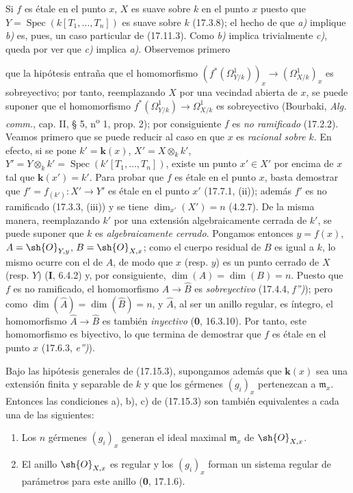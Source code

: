 Si $f$ es étale en el punto $x$, $X$ es suave sobre $k$ en el punto $x$ puesto que $Y=\operatorname{Spec}(k[T_1,\ldots,T_n])$ es suave sobre $k$ (17.3.8); el hecho de que \emph{a)} implique \emph{b)} es, pues, un caso particular de (17.11.3). Como \emph{b)} implica trivialmente \emph{c)}, queda por ver que \emph{c)} implica \emph{a)}. Observemos primero


que la hipótesis entraña que el homomorfismo $(f^*(\varOmega^1_{Y/k}))_x\to(\varOmega^1_{X/k})_x$ es sobreyectivo; por tanto, reemplazando $X$ por una vecindad abierta de $x$, se puede suponer que el homomorfismo $f^*(\varOmega^1_{Y/k})\to\varOmega^1_{X/k}$ es sobreyectivo (Bourbaki, \emph{Alg. comm.}, cap. II, § 5, n\textsuperscript{o} 1, prop. 2); por consiguiente $f$ es \emph{no ramificado} (17.2.2). Veamos primero que se puede reducir al caso en que $x$ es \emph{racional sobre $k$}. En efecto, si se pone $k'=\boldsymbol{k}(x)$, $X'=X\otimes_k k'$, $Y'=Y\otimes_k k'=\operatorname{Spec}(k'[T_1,\ldots,T_n])$, existe un punto $x'\in X'$ por encima de $x$ tal que $\boldsymbol{k}(x')=k'$. Para probar que $f$ es étale en el punto $x$, basta demostrar que $f'=f_{(k')}:X'\to Y'$ es étale en el punto $x'$ (17.7.1, (ii)); además $f'$ es no ramificado (17.3.3, (iii)) y se tiene $\dim_{x'}(X')=n$ (4.2.7). De la misma manera, reemplazando $k'$ por una extensión algebraicamente cerrada de $k'$, se puede suponer que $k$ es \emph{algebraicamente cerrado}. Pongamos entonces $y=f(x)$, $A=\sh{O}_{Y,y}$, $B=\sh{O}_{X,x}$; como el cuerpo residual de $B$ es igual a $k$, lo mismo ocurre con el de $A$, de modo que $x$ (resp. $y$) es un punto cerrado de $X$ (resp. $Y$) (\textbf I, 6.4.2) y, por consiguiente, $\dim(A)=\dim(B)=n$. Puesto que $f$ es no ramificado, el homomorfismo $\widehat A\to\widehat B$ es \emph{sobreyectivo} (17.4.4, \emph{f'')}); pero como $\dim(\widehat A)=\dim(\widehat B)=n$, y $\widehat A$, al ser un anillo regular, es íntegro, el homomorfismo $\widehat A\to\widehat B$ es también \emph{inyectivo} (\textbf 0, 16.3.10). Por tanto, este homomorfismo es biyectivo, lo que termina de demostrar que $f$ es étale en el punto $x$ (17.6.3, \emph{e'')}).

\begin{corollary}[17.15.4]
\label{IV.17.15.4}
Bajo las hipótesis generales de \textup{(17.15.3)}, supongamos además que $\boldsymbol{k}(x)$ sea una extensión \textup{finita} y \textup{separable} de $k$ y que los gérmenes $(g_i)_x$ pertenezcan a $\mathfrak m_x$. Entonces las condiciones \textup{a), b), c)} de \textup{(17.15.3)} son también equivalentes a cada una de las siguientes:
\begin{enumerate}
  \item[\textup{d)}] Los $n$ gérmenes $(g_i)_x$ generan el ideal maximal $\mathfrak m_x$ de $\sh{O}_{X,x}$.
  \item[\textup{d$'$)}] El anillo $\sh{O}_{X,x}$ es regular y los $(g_i)_x$ forman un sistema regular de parámetros para este anillo \textup{(\textbf 0, 17.1.6)}.
\end{enumerate}
\end{corollary}

